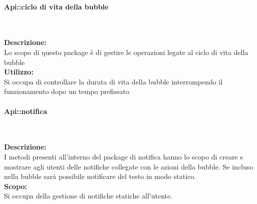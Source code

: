 \begin{samepage}
\paragraph{Api::ciclo di vita della bubble}\label{api-ciclovita}\mbox{}\\
\end{samepage}
\textbf{Descrizione:}\\ 
Lo scopo di questo package è di gestire le operazioni legate al ciclo di vita della bubble\\
\textbf{Utilizzo:}\\
Si occupa di controllare la durata di vita della bubble interrompendo il funzionamento dopo un tempo prefissato\\

\begin{samepage}
\paragraph{Api::notifica}\label{api-notifica}\mbox{}\\
\end{samepage}
\textbf{Descrizione:}\\ 
I metodi presenti all'interno del package di notifica hanno lo scopo di creare e mostrare agli utenti delle notifiche collegate con le azioni della bubble. Se incluso nella bubble sarà possibile notificare del testo in modo statico.\\
\textbf{Scopo:}\\
Si occupa della gestione di notifiche statiche all'utente.\\

